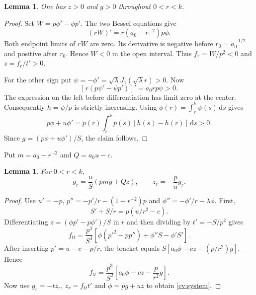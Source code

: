 \documentclass[11pt]{article}
\newtheorem{lemma}[theorem]{Lemma}
\theoremstyle{remark}
\newcommand{\dd}{\,\mathrm d}
\begin{document}
\begin{lemma}
One has $z>0$ and $g>0$ throughout $0<r<k$.
\end{lemma}
\begin{proof}
Set $W=p\phi'-\phi p'$. The two Bessel equations give
\[
 (rW)'=r(a_0-r^{-2})p\phi.
\]
Both endpoint limits of $rW$ are zero. Its derivative is negative
before $r_0=a_0^{-1/2}$ and positive after $r_0$. Hence $W<0$ in
the open interval. Thus $f_r=W/p^2<0$ and $z=f_r/t'>0$.

For the other sign put $\psi=-\phi'=\sqrt\lambda
J_1(\sqrt\lambda r)>0$. Now
\[
 [r(p\psi'-\psi p')]'=a_0rp\psi>0.
\]
The expression on the left before differentiation has limit zero
at the center. Consequently $h=\psi/p$ is strictly increasing.
Using $\phi(r)=\int_r^k\psi(s)\dd s$ gives
\[
 p\phi+u\phi'
 =p(r)\int_r^k p(s)[h(s)-h(r)]\dd s>0.
\]
Since $g=(p\phi+u\phi')/S$, the claim follows.
\end{proof}

Put $m=a_0-r^{-2}$ and $Q=a_0u-c$.
\begin{lemma}
For $0<r<k$,
\begin{equation}\label{cv:system}
 g_r=\frac{u}{S}(pmg+Qz),\qquad z_r=-\frac pu g_r.
\end{equation}
\end{lemma}
\begin{proof}
Use $u'=-p$, $p''=-p'/r-(1-r^{-2})p$ and
$\phi''=-\phi'/r-\lambda\phi$. First,
\[
 S'+S/r=p(u/r^2-c).
\]
Differentiating $z=(\phi p'-p\phi')/S$ in $r$ and then dividing by
$t'=-S/p^2$ gives
\[
 f_{tt}=\frac{p^3}{S^3}
 \left[\phi(p'^2-pp'')+\phi''S-\phi'S'\right].
\]
After inserting $p'=u-c-p/r$, the bracket equals
$S[a_0\phi-cz-(p/r^2)g]$. Hence
\[
 f_{tt}=\frac{p^3}{S^2}
       \left[a_0\phi-cz-\frac p{r^2}g\right].
\]
Now use $g_r=-tz_r$, $z_r=f_{tt}t'$ and $\phi=pg+uz$ to obtain
\eqref{cv:system}.
\end{proof}
\end{document}
